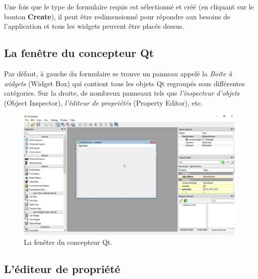 \documentclass[%
oneside,                 %
final,                   %
10pt,french]{article}
\begin{document}
Une fois que le type de formulaire requis est sélectionné et créé (en cliquant sur le bouton \textbf{Create}), il peut être redimensionné pour répondre aux besoins de l'application et tous les widgets peuvent être placés dessus.

\subsection{La fenêtre du concepteur Qt}
Par défaut, à gauche du formulaire se trouve un panneau appelé la \emph{Boîte à widgets} (Widget Box) qui contient tous les objets Qt regroupés sous différentes catégories. Sur la droite, de nombreux panneaux tels que \emph{l'inspecteur d'objets} (Object Inspector), \emph{l'éditeur de propriétés} (Property Editor), etc.


\begin{figure}[!ht]  %
  \centerline{\includegraphics[width=0.9\linewidth]{imgs/designerWindow.png}}
  \caption{
  La fenêtre du concepteur Qt. \label{fig:designerWindow}
  }
\end{figure}


\subsection{L'éditeur de propriété}


\end{document}
